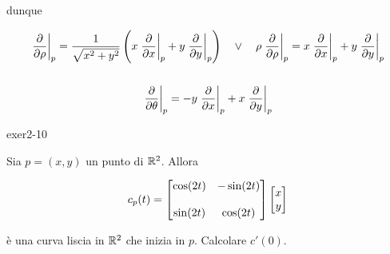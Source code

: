 {dunque

\begin{gather}
	\eval{\pdv{\rho}}_{p} = \dfrac{1}{\sqrt{x^{2} + y^{2}}} \left( x \eval{\pdv{x}}_{p} + y \eval{\pdv{y}}_{p} \right) %
	\quad \lor \quad %
	\rho \eval{\pdv{\rho}}_{p} = x \eval{\pdv{x}}_{p} + y \eval{\pdv{y}}_{p} \\
	\nonumber \\
	\eval{\pdv{\theta}}_{p} = - y \eval{\pdv{x}}_{p} + x \eval{\pdv{y}}_{p}
\end{gather}
}


{exer2-10}
{
Sia $ p = (x,y) $ un punto di $ \mathbb{R}^{2} $. Allora

\begin{equation}
	c_{p}(t) = \bmqty{ \cos(2t) & - \sin(2t) \\ \\ \sin(2t) & \cos(2t) } \bmqty{ x \\ y }
\end{equation}

è una curva liscia in $ \mathbb{R}^{2} $ che inizia in $ p $. Calcolare $ c'(0) $.
}

